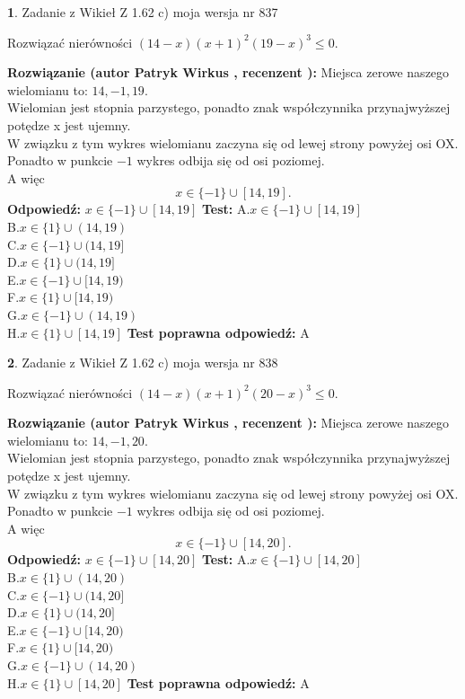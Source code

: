 \documentclass[12pt, a4paper]{article}
\theoremstyle{definition} %
\newtheorem{zad}{}
\newcommand{\zadStart}[1]{\begin{zad}#1\newline}
\newcommand{\zadStop}{\end{zad}}
\newcommand{\rozwStart}[2]{\noindent \textbf{Rozwiązanie (autor #1 , recenzent #2): }\newline}
\newcommand{\rozwStop}{\newline}
\newcommand{\odpStart}{\noindent \textbf{Odpowiedź:}\newline}
\newcommand{\odpStop}{\newline}
\newcommand{\testStart}{\noindent \textbf{Test:}\newline}
\newcommand{\testStop}{\newline}
\newcommand{\kluczStart}{\noindent \textbf{Test poprawna odpowiedź:}\newline}
\newcommand{\kluczStop}{\newline}
\begin{document}
\zadStart{Zadanie z Wikieł Z 1.62 c) moja wersja nr 837}

Rozwiązać nierówności $(14-x)(x+1)^{2}(19-x)^{3}\le0$.
\zadStop
\rozwStart{Patryk Wirkus}{}
Miejsca zerowe naszego wielomianu to: $14, -1, 19$.\\
Wielomian jest stopnia parzystego, ponadto znak współczynnika przy\linebreak najwyższej potędze x jest ujemny.\\ W związku z tym wykres wielomianu zaczyna się od lewej strony powyżej osi OX.\\
Ponadto w punkcie $-1$ wykres odbija się od osi poziomej.\\
A więc $$x \in \{-1\} \cup [14,19].$$
\rozwStop
\odpStart
$x \in \{-1\} \cup [14,19]$
\odpStop
\testStart
A.$x \in \{-1\} \cup [14,19]$\\
B.$x \in \{1\} \cup (14,19)$\\
C.$x \in \{-1\} \cup (14,19]$\\
D.$x \in \{1\} \cup (14,19]$\\
E.$x \in \{-1\} \cup [14,19)$\\
F.$x \in \{1\} \cup [14,19)$\\
G.$x \in \{-1\} \cup (14,19)$\\
H.$x \in \{1\} \cup [14,19]$
\testStop
\kluczStart
A
\kluczStop



\zadStart{Zadanie z Wikieł Z 1.62 c) moja wersja nr 838}

Rozwiązać nierówności $(14-x)(x+1)^{2}(20-x)^{3}\le0$.
\zadStop
\rozwStart{Patryk Wirkus}{}
Miejsca zerowe naszego wielomianu to: $14, -1, 20$.\\
Wielomian jest stopnia parzystego, ponadto znak współczynnika przy\linebreak najwyższej potędze x jest ujemny.\\ W związku z tym wykres wielomianu zaczyna się od lewej strony powyżej osi OX.\\
Ponadto w punkcie $-1$ wykres odbija się od osi poziomej.\\
A więc $$x \in \{-1\} \cup [14,20].$$
\rozwStop
\odpStart
$x \in \{-1\} \cup [14,20]$
\odpStop
\testStart
A.$x \in \{-1\} \cup [14,20]$\\
B.$x \in \{1\} \cup (14,20)$\\
C.$x \in \{-1\} \cup (14,20]$\\
D.$x \in \{1\} \cup (14,20]$\\
E.$x \in \{-1\} \cup [14,20)$\\
F.$x \in \{1\} \cup [14,20)$\\
G.$x \in \{-1\} \cup (14,20)$\\
H.$x \in \{1\} \cup [14,20]$
\testStop
\kluczStart
A
\kluczStop
\end{document}
